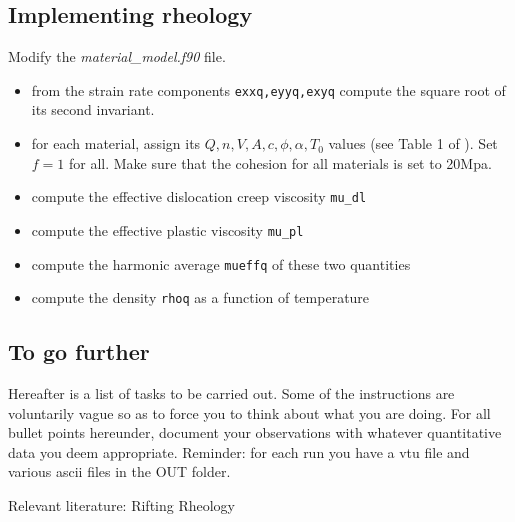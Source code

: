 \documentclass[a4paper]{article}
\begin{document}
\subsection{Implementing rheology}

Modify the {\sl material\_model.f90} file.

\begin{itemize}
\item from the strain rate components {\tt exxq,eyyq,exyq} compute the square root of its second invariant.
\item for each material, assign its $Q,n,V,A,c,\phi,\alpha,T_0$ values (see Table 1 of \cite{nabu15}). Set $f=1$ for all. Make sure that the cohesion for all materials is set to 20Mpa.
\item compute the effective dislocation creep viscosity {\tt mu\_dl}
\item compute the effective plastic viscosity {\tt mu\_pl}
\item compute the harmonic average {\tt mueffq} of these two quantities 
\item compute the density {\tt rhoq} as a function of temperature  
\end{itemize}



\subsection{To go further}

Hereafter is a list of tasks to be carried out. Some of the instructions are voluntarily vague so as to force you to think about what you are doing. For all bullet points hereunder, document your observations with whatever quantitative data you deem appropriate. Reminder: for each run you have a vtu file and various ascii files in the OUT folder. 

Relevant literature: 
Rifting \cite{hube03,hubb05,hube07,hube11,bupb09,alht11,alht12,alhf13,engl83,vacl02} 
Rheology \cite{buro11,budr08,hiko03,kawu93}
\end{document}
